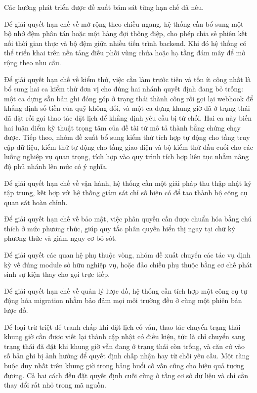 \documentclass[12pt,a4paper,oneside]{report}
\begin{document}
Các hướng phát triển được đề xuất bám sát từng hạn chế đã nêu.

Để giải quyết hạn chế về mở rộng theo chiều ngang, hệ thống cần bổ sung một bộ nhớ đệm phân tán hoặc một hàng đợi thông điệp, cho phép chia sẻ phiên kết nối thời gian thực và bộ đệm giữa nhiều tiến trình backend. Khi đó hệ thống có thể triển khai trên nền tảng điều phối vùng chứa hoặc hạ tầng đám mây để mở rộng theo nhu cầu.

Để giải quyết hạn chế về kiểm thử, việc cần làm trước tiên và tốn ít công nhất là bổ sung hai ca kiểm thử đơn vị cho đúng hai nhánh quyết định đang bỏ trống: một ca dựng sẵn bản ghi đóng góp ở trạng thái thành công rồi gọi lại webhook để khẳng định số tiền của quỹ không đổi, và một ca dựng khung giờ đã ở trạng thái đã đặt rồi gọi thao tác đặt lịch để khẳng định yêu cầu bị từ chối. Hai ca này biến hai luận điểm kỹ thuật trọng tâm của đề tài từ mô tả thành bằng chứng chạy được. Tiếp theo, nhóm đề xuất bổ sung kiểm thử tích hợp tự động cho tầng truy cập dữ liệu, kiểm thử tự động cho tầng giao diện và bộ kiểm thử đầu cuối cho các luồng nghiệp vụ quan trọng, tích hợp vào quy trình tích hợp liên tục nhằm nâng độ phủ nhánh lên mức có ý nghĩa.

Để giải quyết hạn chế về vận hành, hệ thống cần một giải pháp thu thập nhật ký tập trung, kết hợp với hệ thống giám sát chỉ số hiện có để tạo thành bộ công cụ quan sát hoàn chỉnh.

Để giải quyết hạn chế về bảo mật, việc phân quyền cần được chuẩn hóa bằng chú thích ở mức phương thức, giúp quy tắc phân quyền hiển thị ngay tại chữ ký phương thức và giảm nguy cơ bỏ sót.

Để giải quyết các quan hệ phụ thuộc vòng, nhóm đề xuất chuyển các tác vụ định kỳ về đúng module sở hữu nghiệp vụ, hoặc đảo chiều phụ thuộc bằng cơ chế phát sinh sự kiện thay cho gọi trực tiếp.

Để giải quyết hạn chế về quản lý lược đồ, hệ thống cần tích hợp một công cụ tự động hóa migration nhằm bảo đảm mọi môi trường đều ở cùng một phiên bản lược đồ.

Để loại trừ triệt để tranh chấp khi đặt lịch cố vấn, thao tác chuyển trạng thái khung giờ cần được viết lại thành cập nhật có điều kiện, tức là chỉ chuyển sang trạng thái đã đặt khi khung giờ vẫn đang ở trạng thái còn trống, và căn cứ vào số bản ghi bị ảnh hưởng để quyết định chấp nhận hay từ chối yêu cầu. Một ràng buộc duy nhất trên khung giờ trong bảng buổi cố vấn cũng cho hiệu quả tương đương. Cả hai cách đều đặt quyết định cuối cùng ở tầng cơ sở dữ liệu và chỉ cần thay đổi rất nhỏ trong mã nguồn.
\end{document}
